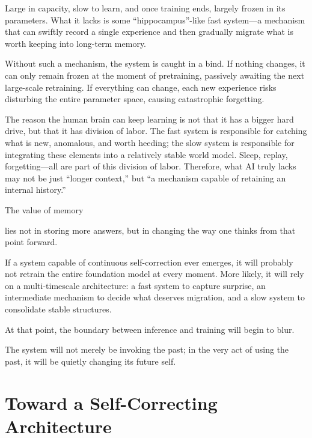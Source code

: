 Large in capacity, slow to learn, and once training ends, largely frozen in its parameters. What it lacks is some ``hippocampus''-like fast system---a mechanism that can swiftly record a single experience and then gradually migrate what is worth keeping into long-term memory.

\vspace{1em}

Without such a mechanism, the system is caught in a bind. If nothing changes, it can only remain frozen at the moment of pretraining, passively awaiting the next large-scale retraining. If everything can change, each new experience risks disturbing the entire parameter space, causing catastrophic forgetting.

\vspace{1em}

The reason the human brain can keep learning is not that it has a bigger hard drive, but that it has division of labor. The fast system is responsible for catching what is new, anomalous, and worth heeding; the slow system is responsible for integrating these elements into a relatively stable world model. Sleep, replay, forgetting---all are part of this division of labor. Therefore, what AI truly lacks may not be just ``longer context,'' but ``a mechanism capable of retaining an internal history.''

\begin{importantbox}
The value of memory

lies not in storing more answers, but in changing the way one thinks from that point forward.
\end{importantbox}

If a system capable of continuous self-correction ever emerges, it will probably not retrain the entire foundation model at every moment. More likely, it will rely on a multi-timescale architecture: a fast system to capture surprise, an intermediate mechanism to decide what deserves migration, and a slow system to consolidate stable structures.

\vspace{1em}

At that point, the boundary between inference and training will begin to blur.

The system will not merely be invoking the past; in the very act of using the past, it will be quietly changing its future self.
\newpage
\section{Toward a Self-Correcting Architecture}

